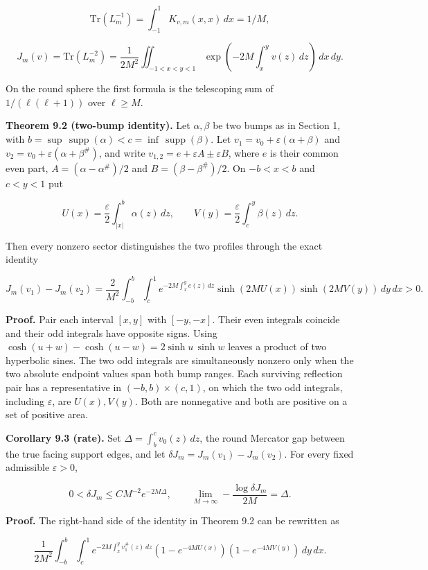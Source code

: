 \documentclass[11pt,letterpaper]{article}
\begin{document}
\[\mathrm{Tr}(L_m^{-1})=\int_{-1}^{1}K_{v,m}(x,x)\,dx=1/M,\]

\[J_m(v)=\mathrm{Tr}(L_m^{-2})=\frac{1}{2M^2}\iint_{-1<x<y<1}\exp\left(-2M\int_x^y v(z)\,dz\right)\,dx\,dy.\]

On the round sphere the first formula is the telescoping sum of \(1/(\ell(\ell+1))\) over
\(\ell\ge M\).

\textbf{Theorem 9.2 (two-bump identity).} Let \(\alpha,\beta\) be two bumps as in Section 1,
with \(b=\sup\,\operatorname{supp}(\alpha)<c=\inf\,\operatorname{supp}(\beta)\). Let
\(v_1=v_0+\varepsilon(\alpha+\beta)\) and \(v_2=v_0+\varepsilon(\alpha+\beta^\#)\), and
write \(v_{1,2}=e+\varepsilon A\pm\varepsilon B\), where \(e\) is their common even part,
\(A=(\alpha-\alpha^\#)/2\) and \(B=(\beta-\beta^\#)/2\). On \(-b<x<b\) and \(c<y<1\) put

\[U(x)=\frac{\varepsilon}{2}\int_{|x|}^{b}\alpha(z)\,dz,\qquad V(y)=\frac{\varepsilon}{2}\int_c^y\beta(z)\,dz.\]

Then every nonzero sector distinguishes the two profiles through the exact identity

\[J_m(v_1)-J_m(v_2)=\frac{2}{M^2}\int_{-b}^{b}\int_c^1 e^{-2M\int_x^y e(z)\,dz}\sinh(2MU(x))\sinh(2MV(y))\,dy\,dx>0.\]

\textbf{Proof.} Pair each interval \([x,y]\) with \([-y,-x]\). Their even integrals coincide
and their odd integrals have opposite signs. Using
\(\cosh(u+w)-\cosh(u-w)=2\sinh u\,\sinh w\) leaves a product of two hyperbolic sines. The
two odd integrals are simultaneously nonzero only when the two absolute endpoint values span
both bump ranges. Each surviving reflection pair has a representative in
\((-b,b)\times(c,1)\), on which the two odd integrals, including \(\varepsilon\), are
\(U(x),V(y)\). Both are nonnegative and both are positive on a set of positive area.

\textbf{Corollary 9.3 (rate).} Set \(\Delta=\int_b^c v_0(z)\,dz\), the round Mercator gap
between the true facing support edges, and let \(\delta J_m=J_m(v_1)-J_m(v_2)\). For every
fixed admissible \(\varepsilon>0\),

\[0<\delta J_m\le C M^{-2}e^{-2M\Delta},\qquad \lim_{M\to\infty}-\frac{\log\delta J_m}{2M}=\Delta.\]

\textbf{Proof.} The right-hand side of the identity in Theorem 9.2 can be rewritten as

\[\frac{1}{2M^2}\int_{-b}^b\int_c^1 e^{-2M\int_x^y v_1^\#(z)\,dz}(1-e^{-4MU(x)})(1-e^{-4MV(y)})\,dy\,dx.\]
\end{document}
